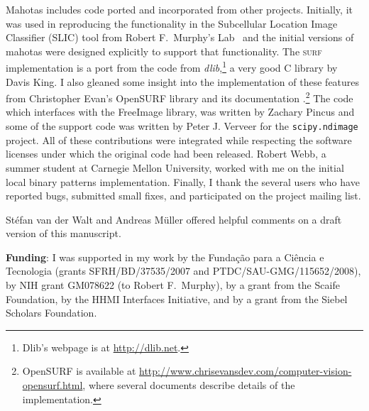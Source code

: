 \documentclass{article}
\newcommand*{\cpp}{{C\nolinebreak[4]\hspace{-.05em}\raisebox{.4ex}{\tiny\textbf{++}}}}
\let\code\texttt
\begin{document}
Mahotas includes code ported and incorporated from other projects. Initially,
it was used in reproducing the functionality in the Subcellular Location Image
Classifier (SLIC) tool from Robert F.\ Murphy's
Lab~\citep{springerlink:10.1007/978-0-387-45524-2_47} and the initial versions
of mahotas were designed explicitly to support that functionality. The
\textsc{surf} implementation is a port from the code from
\textit{dlib},\footnote{Dlib's webpage is at \url{http://dlib.net}.} a very
good \cpp{} library by Davis King. I also gleaned some insight into the
implementation of these features from Christopher Evan's OpenSURF library and
its documentation \citep{evans2009}.\footnote{OpenSURF is available at
\url{http://www.chrisevansdev.com/computer-vision-opensurf.html}, where several
documents describe details of the implementation.} The code which interfaces
with the FreeImage library, was written by Zachary Pincus and some of the
support code was written by Peter J. Verveer for the \code{scipy.ndimage}
project. All of these contributions were integrated while respecting the
software licenses under which the original code had been released. Robert Webb,
a summer student at Carnegie Mellon University, worked with me on the initial
local binary patterns implementation. Finally, I thank the several users who
have reported bugs, submitted small fixes, and participated on the project
mailing list.

Stéfan van der Walt and Andreas Müller offered helpful comments on a draft
version of this manuscript.

\textbf{Funding}: I was supported in my work by the Funda\c c\~{a}o para a
Ci\^encia e Tecnologia (grants SFRH/BD/37535/2007 and
PTDC/SAU-GMG/115652/2008), by NIH grant GM078622 (to Robert F.\ Murphy), by a
grant from the Scaife Foundation, by the HHMI Interfaces Initiative, and by a
grant from the Siebel Scholars Foundation.

\printbibliography
\end{document}
